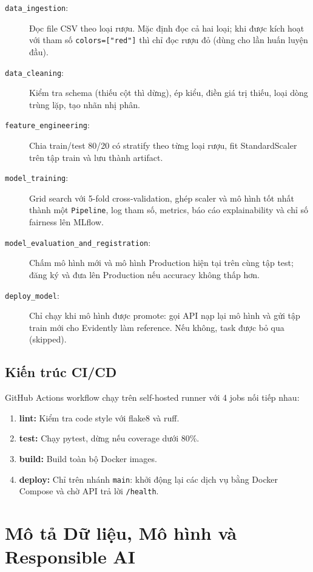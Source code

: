 \documentclass[12pt,a4paper]{report}
\begin{document}
\begin{description}
  \item[\texttt{data\_ingestion}:] Đọc file CSV theo loại rượu. Mặc định đọc cả hai loại; khi được kích hoạt với tham số \texttt{colors=["red"]} thì chỉ đọc rượu đỏ (dùng cho lần huấn luyện đầu).
  \item[\texttt{data\_cleaning}:] Kiểm tra schema (thiếu cột thì dừng), ép kiểu, điền giá trị thiếu, loại dòng trùng lặp, tạo nhãn nhị phân.
  \item[\texttt{feature\_engineering}:] Chia train/test 80/20 có stratify theo từng loại rượu, fit StandardScaler trên tập train và lưu thành artifact.
  \item[\texttt{model\_training}:] Grid search với 5-fold cross-validation, ghép scaler và mô hình tốt nhất thành một \texttt{Pipeline}, log tham số, metrics, báo cáo explainability và chỉ số fairness lên MLflow.
  \item[\texttt{model\_evaluation\_and\_registration}:] Chấm mô hình mới và mô hình Production hiện tại trên cùng tập test; đăng ký và đưa lên Production nếu accuracy không thấp hơn.
  \item[\texttt{deploy\_model}:] Chỉ chạy khi mô hình được promote: gọi API nạp lại mô hình và gửi tập train mới cho Evidently làm reference. Nếu không, task được bỏ qua (skipped).
\end{description}

\section{Kiến trúc CI/CD}

GitHub Actions workflow chạy trên self-hosted runner với 4 jobs nối tiếp nhau:
\begin{enumerate}
  \item \textbf{lint:} Kiểm tra code style với flake8 và ruff.
  \item \textbf{test:} Chạy pytest, dừng nếu coverage dưới 80\%.
  \item \textbf{build:} Build toàn bộ Docker images.
  \item \textbf{deploy:} Chỉ trên nhánh \texttt{main}: khởi động lại các dịch vụ bằng Docker Compose và chờ API trả lời \texttt{/health}.
\end{enumerate}

\chapter{Mô tả Dữ liệu, Mô hình và Responsible AI}
\end{document}
